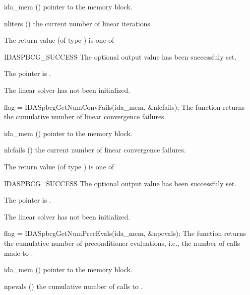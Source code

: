 {{}
{
  \begin{args}[nliters]
  \item[ida\_mem] ()
    pointer to the {\ida} memory block.
  \item[nliters] ()
    the current number of linear iterations.
  \end{args}
}
{
  The return value  (of type ) is one of
  \begin{args}
  \item[IDASPBCG\_SUCCESS] 
    The optional output value has been successfuly set.
  \item[\Id{IDASPBCG\_MEM\_NULL}]
    The  pointer is .
  \item[\Id{IDASPBCG\_LMEM\_NULL}]
    The {\idaspbcg} linear solver has not been initialized.
  \end{args}
}
{}
{
  flag = IDASpbcgGetNumConvFails(ida\_mem, \&nlcfails);
}
{
  The function  returns the
  cumulative number of linear convergence failures.
}
{
  \begin{args}[nlcfails]
  \item[ida\_mem] ()
    pointer to the {\ida} memory block.
  \item[nlcfails] ()
    the current number of linear convergence failures.
  \end{args}
}
{
  The return value  (of type ) is one of
  \begin{args}
  \item[IDASPBCG\_SUCCESS] 
    The optional output value has been successfuly set.
  \item[\Id{IDASPBCG\_MEM\_NULL}]
    The  pointer is .
  \item[\Id{IDASPBCG\_LMEM\_NULL}]
    The {\idaspbcg} linear solver has not been initialized.
  \end{args}
}
{}
{
  flag = IDASpbcgGetNumPrecEvals(ida\_mem, \&npevals);
}
{
  The function  returns the
  cumulative number of preconditioner evaluations, i.e., the number of 
  calls made to .
}
{
  \begin{args}[npevals]
  \item[ida\_mem] ()
    pointer to the {\ida} memory block.
  \item[npevals] ()
    the cumulative number of calls to .

\end{args}}}

